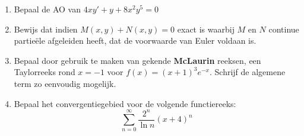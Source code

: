 \documentclass{article}
\begin{document}
\begin{enumerate}
 \item  {
            Bepaal de AO van $4xy' + y +8x^{2}y^{5} = 0$
        }
        
 \item  {
            Bewijs dat indien $M(x, y) + N(x, y) = 0$ exact is waarbij $M$ en $N$ continue partie\"ele afgeleiden heeft, dat de voorwaarde van Euler voldaan is. 
        }

 \item  {
            Bepaal door gebruik te maken van gekende \textbf{McLaurin} reeksen, een Taylorreeks rond $x = -1$ voor $f(x) = (x + 1)^{3}e^{-x}$. Schrijf de algemene term zo eenvoudig mogelijk.
        }

 \item  {
            Bepaal het convergentiegebied voor de volgende functiereeks: $$\sum_{n = 0}^{\infty} \frac{2^n}{\ln n}(x + 4)^{n}$$
        }

\end{enumerate}
\end{document}
